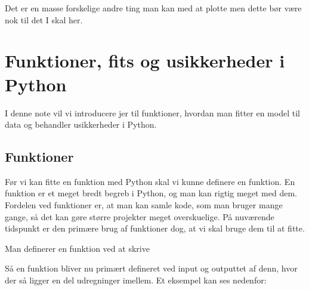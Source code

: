\documentclass[letterpaper,10pt,english]{jupyterBook}
\begin{document}
\begin{sphinxVerbatim}[commandchars=\\\{\}]

\end{sphinxVerbatim}

\noindent{}

Det er en masse forskelige andre ting man kan med at plotte men dette bør være nok til det I skal her.


\section{Funktioner, fits og usikkerheder i Python}
\label{\detokenize{notebooks/MekRel/Funktioner_og_Scipy_optimize-checkpoint:funktioner-fits-og-usikkerheder-i-python}}\label{\detokenize{notebooks/MekRel/Funktioner_og_Scipy_optimize-checkpoint::doc}}
I denne note vil vi introducere jer til funktioner, hvordan man fitter en model til data og behandler usikkerheder i Python.


\subsection{Funktioner}
\label{\detokenize{notebooks/MekRel/Funktioner_og_Scipy_optimize-checkpoint:funktioner}}
Før vi kan fitte en funktion med Python skal vi kunne definere en funktion. En funktion er et meget bredt begreb i Python, og man kan rigtig meget med dem. Fordelen ved funktioner er, at man kan samle kode, som man bruger mange gange, så det kan gøre større projekter meget overskuelige. På nuværende tidspunkt er den primære brug af funktioner dog, at vi skal bruge dem til at fitte.

Man definerer en funktion ved at skrive

\begin{sphinxVerbatim}[commandchars=\\\{\}]
 
     
\end{sphinxVerbatim}

Så en funktion bliver nu primært defineret ved input og outputtet af denn, hvor der så ligger en del udregninger imellem. Et eksempel kan ses nedenfor:

\begin{sphinxVerbatim}[commandchars=\\\{\}]
 
         
\end{sphinxVerbatim}
\end{document}
